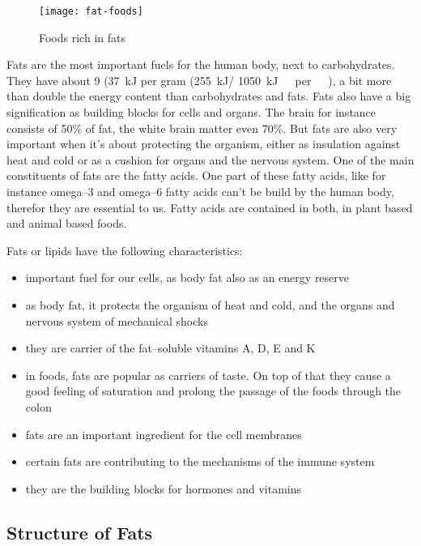 \documentclass[../main.tex]{subfiles}
\begin{document}
\begin{figure}[htb!]
\centering
  \texttt{[image: fat-foods]}
  \caption{Foods rich in fats~\cite{FatFoods}}
\end{figure}

Fats are the most important fuels for the human body, next to carbohydrates.
They have about \SI{9}{\kcal} (\SI{37}{\kilo\joule} per gram (\SI{255}{\kilo\joule}/ \SI{1050}{\kJ\ per\ \oz}),
a bit more than double the energy content than carbohydrates and fats.
Fats also have a big signification as building blocks for cells and organs.
The brain for instance consists of 50\% of fat, the white brain matter even 70\%.
But fats are also very important when it's about protecting the organism,
either as insulation against heat and cold or as a cushion for organs and the nervous system.
One of the main constituents of fats are the fatty acids.
One part of these fatty acids, like for instance omega--3 and omega--6 fatty acids
can't be build by the human body, therefor they are essential to us.
Fatty acids are contained in both, in plant based and animal based foods.

Fats or lipids have the following characteristics:
\begin{itemize}
\item important fuel for our cells, as body fat also as an energy reserve
\item as body fat, it protects the organism of heat and cold, and the organs and nervous system of mechanical shocks
\item they are carrier of the fat--soluble vitamins A, D, E and K
\item in foods, fats are popular as carriers of taste. On top of that
  they cause a good feeling of saturation and prolong the passage of the foods through the colon
\item fats are an important ingredient for the cell membranes
\item certain fats are contributing to the mechanisms of the immune system
\item they are the building blocks for hormones and vitamins 
\end{itemize}

\subsection{Structure of Fats}
\end{document}
